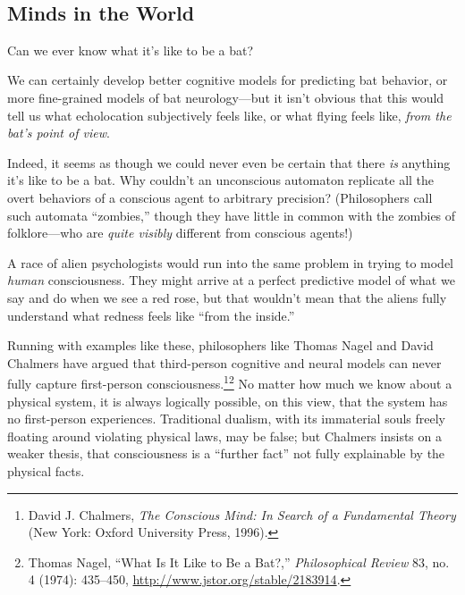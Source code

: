 {
 ~}

\subsection{Minds in the World}

{
 Can we ever know what it's like to be a bat?}

{
 We can certainly develop better cognitive models for predicting
bat behavior, or more fine-grained models of bat neurology---but it
isn't obvious that this would tell us what echolocation
subjectively feels like, or what flying feels like, \textit{from the
bat's point of view}.}

{
 Indeed, it seems as though we could never even be certain that
there \textit{is} anything it's like to be a bat. Why
couldn't an unconscious automaton replicate all the
overt behaviors of a conscious agent to arbitrary precision?
(Philosophers call such automata
``zombies,'' though they have little
in common with the zombies of folklore---who are \textit{quite visibly}
different from conscious agents!)}

{
 A race of alien psychologists would run into the same problem in
trying to model \textit{human} consciousness. They might arrive at a
perfect predictive model of what we say and do when we see a red rose,
but that wouldn't mean that the aliens fully understand
what redness feels like ``from the
inside.''}

{
 Running with examples like these, philosophers like Thomas Nagel
and David Chalmers have argued that third-person cognitive and neural
models can never fully capture first-person
consciousness.\footnote{David J. Chalmers, \textit{The Conscious Mind: In Search of a
Fundamental Theory} (New York: Oxford University Press, 1996).}\supercomma\footnote{Thomas Nagel, ``What Is It Like to Be a
Bat?,'' \textit{Philosophical Review} 83, no. 4
(1974): 435--450, \url{http://www.jstor.org/stable/2183914}.} No matter how much we know about a
physical system, it is always logically possible, on this view, that
the system has no first-person experiences. Traditional dualism, with
its immaterial souls freely floating around violating physical laws,
may be false; but Chalmers insists on a weaker thesis, that
consciousness is a ``further fact''
not fully explainable by the physical facts.}

